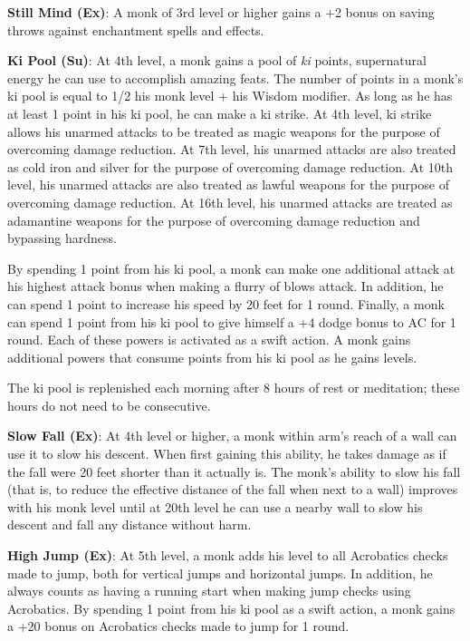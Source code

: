 \textbf{Still Mind (Ex)}: A monk of 3rd level or higher gains a +2 bonus on saving throws against enchantment spells and effects.
				
\textbf{Ki Pool (Su)}: At 4th level, a monk gains a pool of \textit{ki }points, supernatural energy he can use to accomplish amazing feats. The number of points in a monk's ki pool is equal to 1/2 his monk level + his Wisdom modifier. As long as he has at least 1 point in his ki pool, he can make a ki strike. At 4th level, ki strike allows his unarmed attacks to be treated as magic weapons for the purpose of overcoming damage reduction. At 7th level, his unarmed attacks are also treated as cold iron and silver for the purpose of overcoming damage reduction. At 10th level, his unarmed attacks are also treated as lawful weapons for the purpose of overcoming damage reduction. At 16th level, his unarmed attacks are treated as adamantine weapons for the purpose of overcoming damage reduction and bypassing hardness.
				
By spending 1 point from his ki pool, a monk can make one additional attack at his highest attack bonus when making a flurry of blows attack. In addition, he can spend 1 point to increase his speed by 20 feet for 1 round. Finally, a monk can spend 1 point from his ki pool to give himself a +4 dodge bonus to AC for 1 round. Each of these powers is activated as a swift action. A monk gains additional powers that consume points from his ki pool as he gains levels.
				
The ki pool is replenished each morning after 8 hours of rest or meditation; these hours do not need to be consecutive.
				
\textbf{Slow Fall (Ex)}: At 4th level or higher, a monk within arm's reach of a wall can use it to slow his descent. When first gaining this ability, he takes damage as if the fall were 20 feet shorter than it actually is. The monk's ability to slow his fall (that is, to reduce the effective distance of the fall when next to a wall) improves with his monk level until at 20th level he can use a nearby wall to slow his descent and fall any distance without harm.
				
\textbf{High Jump (Ex)}: At 5th level, a monk adds his level to all Acrobatics checks made to jump, both for vertical jumps and horizontal jumps. In addition, he always counts as having a running start when making jump checks using Acrobatics. By spending 1 point from his ki pool as a swift action, a monk gains a +20 bonus on Acrobatics checks made to jump for 1 round.
				
